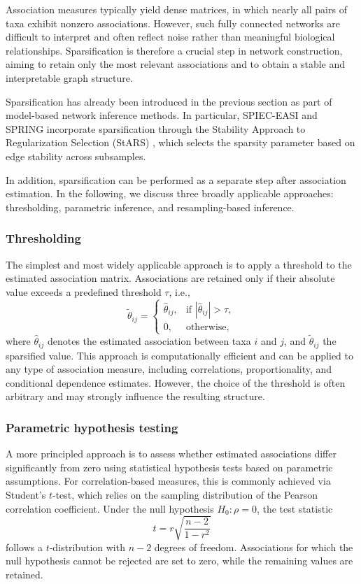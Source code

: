 Association measures typically yield dense matrices, in which nearly all pairs of taxa exhibit nonzero associations. However, such fully connected networks are difficult to interpret and often reflect noise rather than meaningful biological relationships. Sparsification is therefore a crucial step in network construction, aiming to retain only the most relevant associations and to obtain a stable and interpretable graph structure.

Sparsification has already been introduced in the previous section as part of model-based network inference methods. In particular, SPIEC-EASI and SPRING incorporate sparsification through the Stability Approach to Regularization Selection (StARS) \citep{liu2010stability}, which selects the sparsity parameter based on edge stability across subsamples.

In addition, sparsification can be performed as a separate step after association estimation. In the following, we discuss three broadly applicable approaches: thresholding, parametric inference, and resampling-based inference.

\subsubsection*{Thresholding}
The simplest and most widely applicable approach is to apply a threshold to the estimated association matrix. Associations are retained only if their absolute value exceeds a predefined threshold $\tau$, i.e.,
\begin{equation}
\tilde{\theta}_{ij} = 
\begin{cases}
\hat{\theta}_{ij}, & \text{if } |\hat{\theta}_{ij}| > \tau, \\
0, & \text{otherwise},
\end{cases}
\end{equation}
where $\hat{\theta}_{ij}$ denotes the estimated association between taxa $i$ and $j$, and $\tilde{\theta}_{ij}$ the sparsified value. This approach is computationally efficient and can be applied to any type of association measure, including correlations, proportionality, and conditional dependence estimates. However, the choice of the threshold is often arbitrary and may strongly influence the resulting structure.

\subsubsection*{Parametric hypothesis testing}
A more principled approach is to assess whether estimated associations differ significantly from zero using statistical hypothesis tests based on parametric assumptions. For correlation-based measures, this is commonly achieved via Student's $t$-test, which relies on the sampling distribution of the Pearson correlation coefficient. Under the null hypothesis $H_0: \rho = 0$, the test statistic
\begin{equation}
t = r \sqrt{\frac{n-2}{1 - r^2}}
\end{equation}
follows a $t$-distribution with $n-2$ degrees of freedom. Associations for which the null hypothesis cannot be rejected are set to zero, while the remaining values are retained. 

